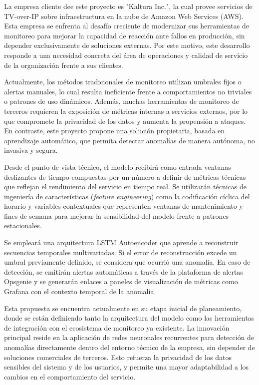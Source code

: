 \documentclass[
11pt, %
]{charter}
\begin{document}
La empresa cliente dee este proyecto es "Kaltura Inc.", la cual provee servicios de TV-over-IP sobre infraestructura en la nube de Amazon Web Services (AWS). Esta empresa se enfrenta al desafío creciente de modernizar sus herramientas de monitoreo para mejorar la capacidad de reacción ante fallos en producción, sin depender exclusivamente de soluciones externas. Por este motivo, este desarrollo responde a una necesidad concreta del área de operaciones y calidad de servicio de la organización frente a sus clientes.

Actualmente, los métodos tradicionales de monitoreo utilizan umbrales fijos o alertas manuales, lo cual resulta ineficiente frente a comportamientos no triviales o patrones de uso dinámicos. Además, muchas herramientas de monitoreo de terceros requieren la exposición de métricas internas a servicios externos, por lo que compromete  la privacidad de los datos y aumenta la propensión a ataques. En contraste, este proyecto propone una solución propietaria, basada en aprendizaje automático, que permita detectar anomalías de manera autónoma, no invasiva y segura.

Desde el punto de vista técnico, el modelo recibirá como entrada ventanas deslizantes de tiempo compuestas por un número a definir de métricas técnicas que reflejan el rendimiento del servicio en tiempo real. Se utilizarán técnicas de ingeniería de características (\textit{feature engineering}) como la codificación cíclica del horario y variables contextuales que representen ventanas de mantenimiento y fines de semana para mejorar la sensibilidad del modelo frente a patrones estacionales.

Se empleará una arquitectura LSTM Autoencoder que aprende a reconstruir secuencias temporales multivariadas. Si el error de reconstrucción excede un umbral previamente definido, se considera que ocurrió una anomalía. En caso de detección, se emitirán alertas automáticas a través de la plataforma de alertas Opsgenie y se generarán enlaces a paneles de visualización de métricas como Grafana con el contexto temporal de la anomalía.

Esta propuesta se encuentra actualmente en su etapa inicial de planeamiento, donde se están definiendo tanto la arquitectura del modelo como las herramientas de integración con el ecosistema de monitoreo ya existente. La innovación principal reside en la aplicación de redes neuronales recurrentes para detección de anomalías directamente dentro del entorno técnico de la empresa, sin depender de soluciones comerciales de terceros. Esto refuerza la privacidad de los datos sensibles del sistema y de los usuarios, y permite una mayor adaptabilidad a los cambios en el comportamiento del servicio.
\end{document}
